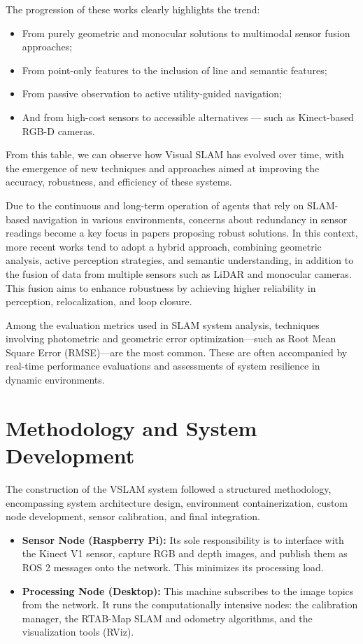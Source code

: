 \documentclass[a4paper,12pt]{article}
\begin{document}
The progression of these works clearly highlights the trend:
\begin{itemize}
    \item From purely geometric and monocular solutions to multimodal sensor fusion approaches;
    \item From point-only features to the inclusion of line and semantic features;
    \item From passive observation to active utility-guided navigation;
    \item And from high-cost sensors to accessible alternatives — such as Kinect-based RGB-D cameras.
\end{itemize}

From this table, we can observe how Visual SLAM has evolved over time, with the emergence of new techniques and approaches aimed at improving the accuracy, robustness, and efficiency of these systems.

Due to the continuous and long-term operation of agents that rely on SLAM-based navigation in various environments, concerns about redundancy in sensor readings become a key focus in papers proposing robust solutions. In this context, more recent works tend to adopt a hybrid approach, combining geometric analysis, active perception strategies, and semantic understanding, in addition to the fusion of data from multiple sensors such as LiDAR and monocular cameras. This fusion aims to enhance robustness by achieving higher reliability in perception, relocalization, and loop closure.

Among the evaluation metrics used in SLAM system analysis, techniques involving photometric and geometric error optimization—such as Root Mean Square Error (RMSE)—are the most common. These are often accompanied by real-time performance evaluations and assessments of system resilience in dynamic environments.

\section{Methodology and System Development}

The construction of the VSLAM system followed a structured methodology, encompassing system architecture design, environment containerization, custom node development, sensor calibration, and final integration.

\begin{itemize}
    \item \textbf{Sensor Node (Raspberry Pi):} Its sole responsibility is to interface with the Kinect V1 sensor, capture RGB and depth images, and publish them as ROS 2 messages onto the network. This minimizes its processing load.
    \item \textbf{Processing Node (Desktop):} This machine subscribes to the image topics from the network. It runs the computationally intensive nodes: the calibration manager, the RTAB-Map SLAM and odometry algorithms, and the visualization tools (RViz).
\end{itemize}
\end{document}

